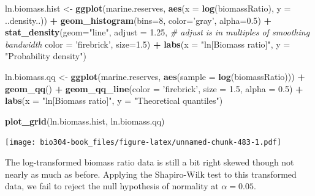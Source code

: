 \documentclass[]{book}
\newenvironment{Shaded}{\begin{snugshade}}{\end{snugshade}}
\newcommand{\CommentTok}[1]{\textcolor[rgb]{0.56,0.35,0.01}{\textit{#1}}}
\newcommand{\DataTypeTok}[1]{\textcolor[rgb]{0.13,0.29,0.53}{#1}}
\newcommand{\DecValTok}[1]{\textcolor[rgb]{0.00,0.00,0.81}{#1}}
\newcommand{\FloatTok}[1]{\textcolor[rgb]{0.00,0.00,0.81}{#1}}
\newcommand{\KeywordTok}[1]{\textcolor[rgb]{0.13,0.29,0.53}{\textbf{#1}}}
\newcommand{\NormalTok}[1]{#1}
\newcommand{\OperatorTok}[1]{\textcolor[rgb]{0.81,0.36,0.00}{\textbf{#1}}}
\newcommand{\StringTok}[1]{\textcolor[rgb]{0.31,0.60,0.02}{#1}}
\theoremstyle{definition}
\theoremstyle{definition}
\theoremstyle{definition}
\theoremstyle{remark}
\begin{document}
\begin{Shaded}
\begin{Highlighting}[]
\NormalTok{ln.biomass.hist <-}\StringTok{ }
\StringTok{  }\KeywordTok{ggplot}\NormalTok{(marine.reserves, }\KeywordTok{aes}\NormalTok{(}\DataTypeTok{x =} \KeywordTok{log}\NormalTok{(biomassRatio), }\DataTypeTok{y =}\NormalTok{ ..density..)) }\OperatorTok{+}\StringTok{ }
\StringTok{  }\KeywordTok{geom_histogram}\NormalTok{(}\DataTypeTok{bins=}\DecValTok{8}\NormalTok{, }\DataTypeTok{color=}\StringTok{'gray'}\NormalTok{, }\DataTypeTok{alpha=}\FloatTok{0.5}\NormalTok{) }\OperatorTok{+}\StringTok{ }
\StringTok{  }\KeywordTok{stat_density}\NormalTok{(}\DataTypeTok{geom=}\StringTok{"line"}\NormalTok{,}
               \DataTypeTok{adjust =} \FloatTok{1.25}\NormalTok{,   }\CommentTok{# adjust is in multiples of smoothing bandwidth}
               \DataTypeTok{color =} \StringTok{'firebrick'}\NormalTok{, }\DataTypeTok{size=}\FloatTok{1.5}\NormalTok{) }\OperatorTok{+}
\StringTok{  }\KeywordTok{labs}\NormalTok{(}\DataTypeTok{x =} \StringTok{"ln[Biomass ratio]"}\NormalTok{, }\DataTypeTok{y =} \StringTok{"Probability density"}\NormalTok{)}

\NormalTok{ln.biomass.qq <-}
\StringTok{  }\KeywordTok{ggplot}\NormalTok{(marine.reserves, }\KeywordTok{aes}\NormalTok{(}\DataTypeTok{sample =} \KeywordTok{log}\NormalTok{(biomassRatio))) }\OperatorTok{+}\StringTok{ }
\StringTok{  }\KeywordTok{geom_qq}\NormalTok{() }\OperatorTok{+}\StringTok{ }
\StringTok{  }\KeywordTok{geom_qq_line}\NormalTok{(}\DataTypeTok{color =} \StringTok{'firebrick'}\NormalTok{, }\DataTypeTok{size =} \FloatTok{1.5}\NormalTok{, }\DataTypeTok{alpha =} \FloatTok{0.5}\NormalTok{) }\OperatorTok{+}
\StringTok{  }\KeywordTok{labs}\NormalTok{(}\DataTypeTok{x =} \StringTok{"ln[Biomass ratio]"}\NormalTok{, }\DataTypeTok{y =} \StringTok{"Theoretical quantiles"}\NormalTok{)}

\KeywordTok{plot_grid}\NormalTok{(ln.biomass.hist, ln.biomass.qq)}
\end{Highlighting}
\end{Shaded}

\texttt{[image: bio304-book\_files/figure-latex/unnamed-chunk-483-1.pdf]}

The log-transformed biomass ratio data is still a bit right skewed
though not nearly as much as before. Applying the Shapiro-Wilk test to
this transformed data, we fail to reject the null hypothesis of
normality at \(\alpha = 0.05\).

\begin{Shaded}
\end{Shaded}
\end{document}
